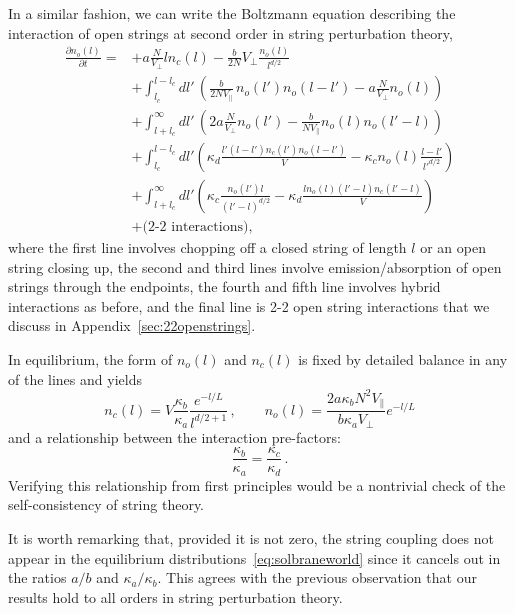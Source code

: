 \documentclass[a4paper,11pt]{article}
\newcommand{\lr}[1]{\left(#1\right)}
\begin{document}
In a similar fashion, we can write the Boltzmann equation describing the interaction of open strings at second order in string perturbation theory,
\begin{equation}\label{eq:boltzmannopenbrane}
    \begin{split}
        \frac{\partial n_o(l)}{\partial t}=&+a\frac{N}{V_\perp}ln_c(l)-\frac{b}{2N}V_\perp\frac{n_o(l)}{l^{d/2}}\\ 
        &+\int_{l_c}^{l-l_c}{dl'\, \lr{\frac{b}{2NV_\parallel}\, n_o(l')n_o(l-l')-a\frac{N}{V_\perp}n_o(l)}}\\ &
        +\int_{l+l_c}^{\infty}{dl'\, \lr{2a\frac{N}{V_\perp}n_o(l') -\frac{b}{NV_\parallel}n_o(l)n_o(l'-l)}} \\
        &+\int_{l_c}^{l-l_c}{dl' \lr{\kappa_d\frac{l'(l-l')n_c(l')n_o(l-l')}{V}-\kappa_c n_o(l)\frac{l-l'}{l'^{d/2}}}}\\
        &+\int_{l+l_c}^\infty{dl'\lr{\kappa_c\frac{n_o(l')l}{(l'-l)^{d/2}}-\kappa_d\frac{ln_o(l)(l'-l)n_c(l'-l)}{V}}}\\
        &+\text{(2-2 interactions)},
    \end{split}
\end{equation}
where the first line involves chopping off a closed string of length $l$ or an open string closing up, the second and third lines involve emission/absorption of open strings through the endpoints, the fourth and fifth line involves hybrid interactions as before, and the final line is 2-2 open string interactions that we discuss in Appendix~\ref{sec:22openstrings}.

In equilibrium, the form of $n_o(l)$ and $n_c(l)$ is fixed by detailed balance in any of the lines 
and yields
\begin{equation}\label{eq:solbraneworld}
    n_c(l)=V\frac{\kappa_b}{\kappa_a}\frac{e^{-l/L}}{l^{d/2+1}}\, , \qquad n_o(l)=\frac{2a\kappa_b N^2V_\parallel}{b\kappa_a V_\perp}e^{-l/L}
\end{equation}
and a relationship between the interaction pre-factors:
\begin{equation}
    \frac{\kappa_b}{\kappa_a}=\frac{\kappa_c}{\kappa_d}\, .
\end{equation}
Verifying this relationship from first principles would be a nontrivial check of the self-consistency of string theory.

It is worth remarking that, provided it is not zero, the string coupling does not appear in the equilibrium distributions~\eqref{eq:solbraneworld} since it cancels out in the ratios $a/b$ and $\kappa_a/\kappa_b$.
This agrees with the previous observation that our results hold to all orders in string perturbation theory.
\end{document}
